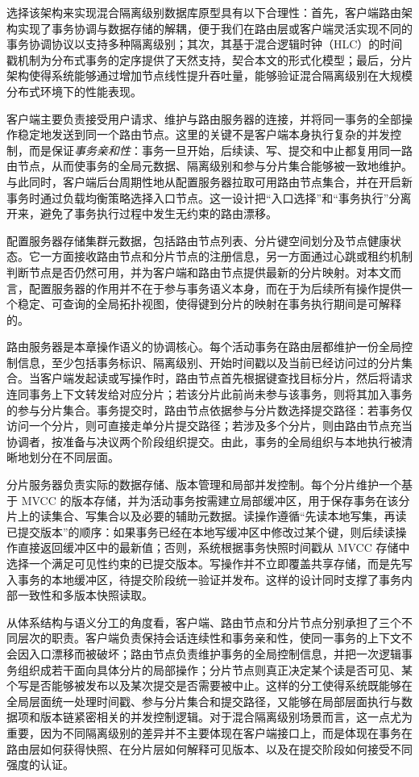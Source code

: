 选择该架构来实现混合隔离级别数据库原型具有以下合理性\cite{stonebraker1986case}：首先，客户端路由架构实现了事务协调与数据存储的解耦，便于我们在路由层或客户端灵活实现不同的事务协调协议以支持多种隔离级别；其次，其基于混合逻辑时钟（HLC）的时间戳机制为分布式事务的定序提供了天然支持，契合本文的形式化模型；最后，分片架构使得系统能够通过增加节点线性提升吞吐量，能够验证混合隔离级别在大规模分布式环境下的性能表现。

客户端主要负责接受用户请求、维护与路由服务器的连接，并将同一事务的全部操作稳定地发送到同一个路由节点。这里的关键不是客户端本身执行复杂的并发控制，而是保证\emph{事务亲和性}：事务一旦开始，后续读、写、提交和中止都复用同一路由节点，从而使事务的全局元数据、隔离级别和参与分片集合能够被一致地维护。与此同时，客户端后台周期性地从配置服务器拉取可用路由节点集合，并在开启新事务时通过负载均衡策略选择入口节点。这一设计把“入口选择”和“事务执行”分离开来，避免了事务执行过程中发生无约束的路由漂移。

配置服务器存储集群元数据，包括路由节点列表、分片键空间划分及节点健康状态。它一方面接收路由节点和分片节点的注册信息，另一方面通过心跳或租约机制判断节点是否仍然可用，并为客户端和路由节点提供最新的分片映射。对本文而言，配置服务器的作用并不在于参与事务语义本身，而在于为后续所有操作提供一个稳定、可查询的全局拓扑视图，使得键到分片的映射在事务执行期间是可解释的。

路由服务器是本章操作语义的协调核心。每个活动事务在路由层都维护一份全局控制信息，至少包括事务标识、隔离级别、开始时间戳以及当前已经访问过的分片集合。当客户端发起读或写操作时，路由节点首先根据键查找目标分片，然后将请求连同事务上下文转发给对应分片；若该分片此前尚未参与该事务，则将其加入事务的参与分片集合。事务提交时，路由节点依据参与分片数选择提交路径：若事务仅访问一个分片，则可直接走单分片提交路径；若涉及多个分片，则由路由节点充当协调者，按准备与决议两个阶段组织提交。由此，事务的全局组织与本地执行被清晰地划分在不同层面。

分片服务器负责实际的数据存储、版本管理和局部并发控制。每个分片维护一个基于 MVCC 的版本存储\cite{rethinkmvcc}，并为活动事务按需建立局部缓冲区，用于保存事务在该分片上的读集合、写集合以及必要的辅助元数据。读操作遵循“先读本地写集，再读已提交版本”的顺序：如果事务已经在本地写缓冲区中修改过某个键，则后续读操作直接返回缓冲区中的最新值；否则，系统根据事务快照时间戳从 MVCC 存储中选择一个满足可见性约束的已提交版本。写操作并不立即覆盖共享存储，而是先写入事务的本地缓冲区，待提交阶段统一验证并发布。这样的设计同时支撑了事务内部一致性和多版本快照读取。

从体系结构与语义分工的角度看，客户端、路由节点和分片节点分别承担了三个不同层次的职责。客户端负责保持会话连续性和事务亲和性，使同一事务的上下文不会因入口漂移而被破坏；路由节点负责维护事务的全局控制信息，并把一次逻辑事务组织成若干面向具体分片的局部操作；分片节点则真正决定某个读是否可见、某个写是否能够被发布以及某次提交是否需要被中止。这样的分工使得系统既能够在全局层面统一处理时间戳、参与分片集合和提交路径，又能够在局部层面执行与数据项和版本链紧密相关的并发控制逻辑。对于混合隔离级别场景而言，这一点尤为重要，因为不同隔离级别的差异并不主要体现在客户端接口上，而是体现在事务在路由层如何获得快照、在分片层如何解释可见版本、以及在提交阶段如何接受不同强度的认证。

